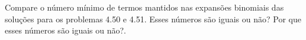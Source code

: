 Compare o número mínimo de termos mantidos nas expansões binomiais das soluções para os problemas 4.50 e 4.51. Esses números são iguais ou não? Por que esses números são iguais ou não?.

